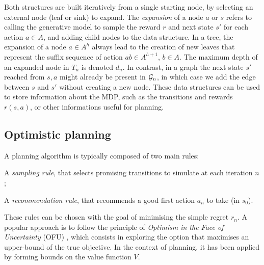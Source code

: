 \documentclass[runningheads]{llncs}
\begin{document}
Both structures are built iteratively from a single starting node, by selecting an external node (leaf or sink) to expand. The \emph{expansion} of a node $a$ or $s$ refers to calling the generative model to sample the reward $r$ and next state $s'$ for each action $a\in A$, and adding child nodes to the data structure. In a tree, the expansion of a node $a\in A^h$ always lead to the creation of new leaves that represent the suffix sequence of action $ab\in A^{h+1},\, b\in A$. The maximum depth of an expanded node in $T_n$ is denoted $d_n$. In contrast, in a graph the next state $s'$ reached from $s,a$ might already be present in $\mathcal{G}_n$, in which case we add the edge between $s$ and $s'$ without creating a new node.
These data structures can be used to store information about the MDP, such as the transitions and rewards $r(s, a)$, or other informations useful for planning.


\subsection{Optimistic planning}

A planning algorithm is typically composed of two main rules:
\begin{enumerate*}[label=(\roman*)]
	\item A \emph{sampling rule}, that selects promising transitions to simulate at each iteration $n$;
	\item A \emph{recommendation rule}, that recommends a good first action $a_n$ 	to take (in $s_0$).
\end{enumerate*}
These rules can be chosen with the goal of minimising the simple regret $r_n$.
A popular approach is to follow the principle of \emph{Optimism in the Face of Uncertainty} (OFU) \citep[see][]{Munos14}, which consists in exploring the option that maximises an upper-bound of the true objective. In the context of planning, it has been applied by forming bounds on the value function $V$.
\end{document}

